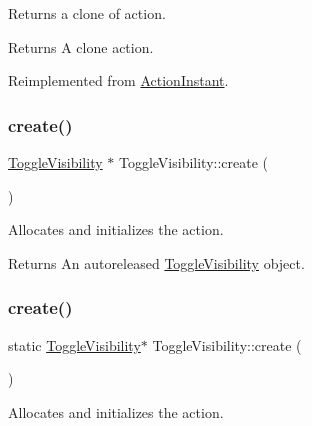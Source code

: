 Returns a clone of action.

\begin{DoxyReturn}{Returns}
A clone action. 
\end{DoxyReturn}


Reimplemented from \hyperlink{classActionInstant_adb76fc6f006098109e8256210cbd8cc0}{Action\+Instant}.

\mbox{\label{classToggleVisibility_a94c07c1f0644b5c17f540016e6311303}} 
\subsubsection{\texorpdfstring{create()}{create()}\hspace{0.1cm}{\footnotesize\ttfamily [1/2]}}
{\footnotesize\ttfamily \hyperlink{classToggleVisibility}{Toggle\+Visibility} $\ast$ Toggle\+Visibility\+::create (\begin{DoxyParamCaption}{ }\end{DoxyParamCaption})\hspace{0.3cm}{\ttfamily [static]}}

Allocates and initializes the action.

\begin{DoxyReturn}{Returns}
An autoreleased \hyperlink{classToggleVisibility}{Toggle\+Visibility} object. 
\end{DoxyReturn}
\mbox{\label{classToggleVisibility_a03f7c838b5c70cc4239eafeb42e9ed41}} 
\subsubsection{\texorpdfstring{create()}{create()}\hspace{0.1cm}{\footnotesize\ttfamily [2/2]}}
{\footnotesize\ttfamily static \hyperlink{classToggleVisibility}{Toggle\+Visibility}$\ast$ Toggle\+Visibility\+::create (\begin{DoxyParamCaption}{ }\end{DoxyParamCaption})\hspace{0.3cm}{\ttfamily [static]}}

Allocates and initializes the action.

